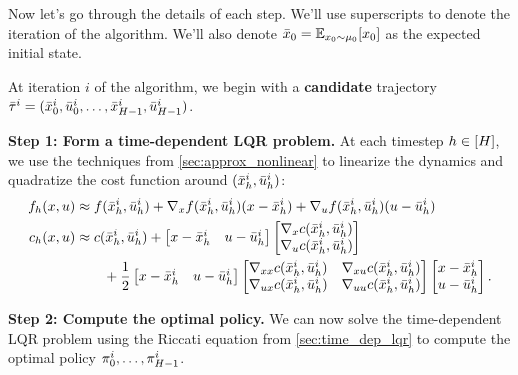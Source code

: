 \documentclass[../main/main]{subfiles}
\begin{document}
Now let's go through the details of each step. We'll use superscripts to denote the iteration of the algorithm. We'll also denote $\bar {x}_0 = \operatorname*{\mathbb{E}}_{x_0 \sim \mu_0} [x_0]$ as the expected initial state.

At iteration $i$ of the algorithm, we begin with a \textbf{candidate} trajectory $\bar \tau^i = (\bar {x}^i_0, \bar {u}^i_0, \dots, \bar {x}^i_{H-1}, \bar {u}^i_{H-1})$.

\textbf{Step 1: Form a time-dependent LQR problem.}
At each timestep $h \in [H]$, we use the techniques from \autoref{sec:approx_nonlinear} to linearize the dynamics and quadratize the cost function around $(\bar {x}^i_h, \bar {u}^i_h)$:
\begingroup
\newcommand{\iter}[1]{\bar {#1}^i_\hi}
\newcommand{\grad}[2]{\nabla_{#2} #1(\iter \st, \iter \act)}
\begin{align*}
    f_\hi(\st, \act) &\approx f(\iter \st, \iter \act) + \grad f \st (\st - \iter \st) + \grad f \act (\act - \iter \act) \\
    c_\hi(\st, \act) &\approx c(\iter \st, \iter \act) + \begin{bmatrix}
        \st - \iter \st & \act - \iter \act
    \end{bmatrix} \begin{bmatrix}
        \grad c \st \\
        \grad c \act
    \end{bmatrix} \\
    &\qquad + \frac{1}{2} \begin{bmatrix}
        \st - \iter \st & \act - \iter \act
    \end{bmatrix} \begin{bmatrix}
        \nabla_{\st \st} c(\iter \st, \iter \act) & \nabla_{\st \act} c(\iter \st, \iter \act) \\
        \nabla_{\act \st} c(\iter \st, \iter \act) & \nabla_{\act \act} c(\iter \st, \iter \act)
    \end{bmatrix}
    \begin{bmatrix}
        \st - \iter \st \\
        \act - \iter \act
    \end{bmatrix}.
\end{align*}
\endgroup

\textbf{Step 2: Compute the optimal policy.}
We can now solve the time-dependent LQR problem using the Riccati equation from \autoref{sec:time_dep_lqr} to compute the optimal policy $\pi^i_0, \dots, \pi^i_{H-1}$.
\end{document}
